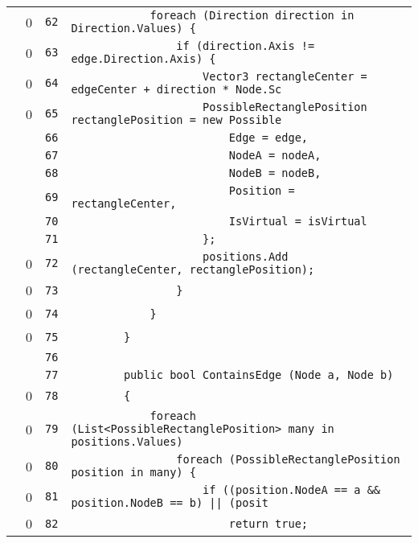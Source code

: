 \documentclass[a4paper,10pt]{article}
\begin{document}
\begin{longtable}[l]{lrrl}
\cellcolor{red} & 0 & \verb~62~ & \verb~            foreach (Direction direction in Direction.Values) {~\\
\cellcolor{red} & 0 & \verb~63~ & \verb~                if (direction.Axis != edge.Direction.Axis) {~\\
\cellcolor{red} & 0 & \verb~64~ & \verb~                    Vector3 rectangleCenter = edgeCenter + direction * Node.Sc~\\
\cellcolor{red} & 0 & \verb~65~ & \verb~                    PossibleRectanglePosition rectanglePosition = new Possible~\\
\cellcolor{gray} &  & \verb~66~ & \verb~                        Edge = edge,~\\
\cellcolor{gray} &  & \verb~67~ & \verb~                        NodeA = nodeA,~\\
\cellcolor{gray} &  & \verb~68~ & \verb~                        NodeB = nodeB,~\\
\cellcolor{gray} &  & \verb~69~ & \verb~                        Position = rectangleCenter,~\\
\cellcolor{gray} &  & \verb~70~ & \verb~                        IsVirtual = isVirtual~\\
\cellcolor{gray} &  & \verb~71~ & \verb~                    };~\\
\cellcolor{red} & 0 & \verb~72~ & \verb~                    positions.Add (rectangleCenter, rectanglePosition);~\\
\cellcolor{red} & 0 & \verb~73~ & \verb~                }~\\
\cellcolor{red} & 0 & \verb~74~ & \verb~            }~\\
\cellcolor{red} & 0 & \verb~75~ & \verb~        }~\\
\cellcolor{gray} &  & \verb~76~ & \verb~~\\
\cellcolor{gray} &  & \verb~77~ & \verb~        public bool ContainsEdge (Node a, Node b)~\\
\cellcolor{red} & 0 & \verb~78~ & \verb~        {~\\
\cellcolor{red} & 0 & \verb~79~ & \verb~            foreach (List<PossibleRectanglePosition> many in positions.Values)~\\
\cellcolor{red} & 0 & \verb~80~ & \verb~                foreach (PossibleRectanglePosition position in many) {~\\
\cellcolor{red} & 0 & \verb~81~ & \verb~                    if ((position.NodeA == a && position.NodeB == b) || (posit~\\
\cellcolor{red} & 0 & \verb~82~ & \verb~                        return true;~\\

\end{longtable}
\end{document}

